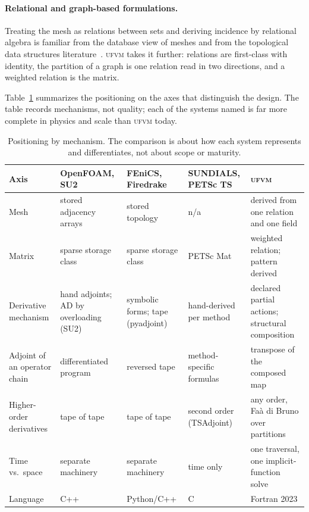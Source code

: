 \documentclass[11pt,a4paper]{article}
\newcommand{\ufvm}{\textsc{ufvm}}
\begin{document}
\paragraph{Relational and graph-based formulations.} Treating the mesh as relations between sets and deriving incidence by relational algebra is familiar from the database view of meshes and from the topological data structures literature~\cite{garimella2002}. \ufvm{} takes it further: relations are first-class with identity, the partition of a graph is one relation read in two directions, and a weighted relation is the matrix.

Table~\ref{tab:compare} summarizes the positioning on the axes that distinguish the design. The table records mechanisms, not quality; each of the systems named is far more complete in physics and scale than \ufvm{} today.

\begin{table}[htbp]
\centering\footnotesize
\begin{tabular}{@{}p{2.3cm}p{3.0cm}p{3.0cm}p{3.0cm}p{3.4cm}@{}}
\toprule
Axis & OpenFOAM, SU2 & FEniCS, Firedrake & SUNDIALS, PETSc TS & \ufvm \\
\midrule
Mesh & stored adjacency arrays & stored topology & n/a & derived from one relation and one field \\
Matrix & sparse storage class & sparse storage class & PETSc Mat & weighted relation; pattern derived \\
Derivative mechanism & hand adjoints; AD by overloading (SU2) & symbolic forms; tape (pyadjoint) & hand-derived per method & declared partial actions; structural composition \\
Adjoint of an operator chain & differentiated program & reversed tape & method-specific formulas & transpose of the composed map \\
Higher-order derivatives & tape of tape & tape of tape & second order (TSAdjoint) & any order, Faà di Bruno over partitions \\
Time vs.\ space & separate machinery & separate machinery & time only & one traversal, one implicit-function solve \\
Language & C++ & Python/C++ & C & Fortran 2023 \\
\bottomrule
\end{tabular}
\caption{Positioning by mechanism. The comparison is about how each system represents and differentiates, not about scope or maturity.}
\label{tab:compare}
\end{table}
\end{document}
